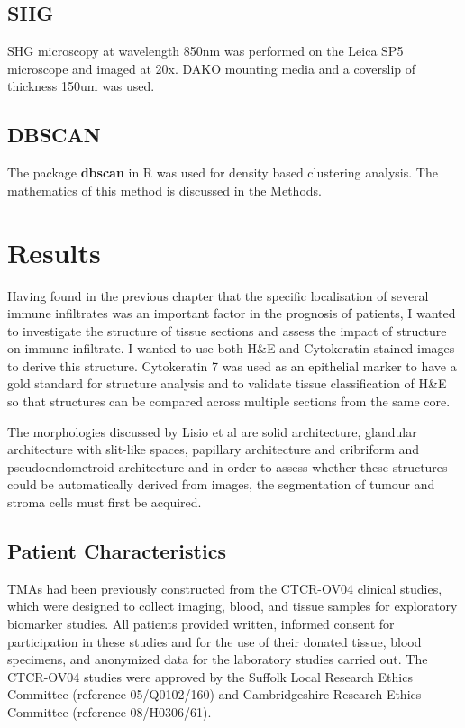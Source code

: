 \subsection{SHG}
SHG microscopy at wavelength 850nm was performed on the Leica SP5 microscope and imaged at 20x. DAKO mounting media and a coverslip of thickness 150um was used. 

\subsection{DBSCAN}
The package \textbf{dbscan} in R was used for density based clustering analysis. The mathematics of this method is discussed in the Methods. 

\section{Results}
Having found in the previous chapter that the specific localisation of several immune infiltrates was an important factor in the prognosis of patients, I wanted to investigate the structure of tissue sections and assess the impact of structure on immune infiltrate. I wanted to use both H\&E and Cytokeratin stained images to derive this structure. Cytokeratin 7 was used as an epithelial marker to have a gold standard for structure analysis and to validate tissue classification of H\&E so that structures can be compared across multiple sections from the same core.

The morphologies discussed by Lisio et al are solid architecture, glandular architecture with slit-like spaces, papillary architecture and cribriform and pseudoendometroid architecture\cite{Lisio2019Feb} and in order to assess whether these structures could be automatically derived from images, the segmentation of tumour and stroma cells must first be acquired. 

\subsection{Patient Characteristics}
TMAs had been previously constructed from the CTCR-OV04 clinical studies, which were designed to collect imaging, blood, and tissue samples for exploratory biomarker studies. All patients provided written, informed consent for participation in these studies and for the use of their donated tissue, blood specimens, and anonymized data for the laboratory studies carried out. The CTCR-OV04 studies were approved by the Suffolk Local Research Ethics Committee (reference 05/Q0102/160) and Cambridgeshire Research Ethics Committee (reference 08/H0306/61).\cite{}

